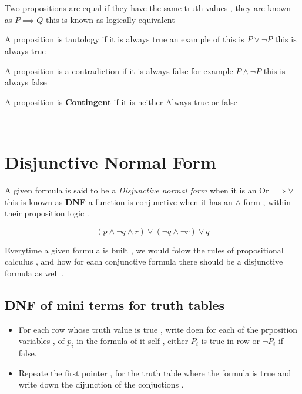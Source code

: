 \documentclass{article}
\theoremstyle{mytheoremstyle}
\theoremstyle{mytheoremstyle}
\theoremstyle{myproblemstyle}
\begin{document}
\\ \\


\begin{definition}
 Two propositions are equal if they have the same truth values , they are known as $ P \implies Q$ this is known as logically equivalent
\end{definition}

\begin{definition}
A proposition is tautology if it is always true an example of this is $ P \lor \neg P$ this is always true

\end{definition}

\begin{definition}
A proposition is a contradiction if it is always false for example $ P \land \neg P $ this is always false
\end{definition}

\begin{definition}
A proposition is \textbf{Contingent} if it is neither Always true or false
\end{definition}

\\
\section{Disjunctive Normal Form}
A given formula is said to be a \textit{Disjunctive normal form} when it is an Or $\implies \lor$ this is known as \textbf{DNF} a function is conjunctive when it has an $ \land $ form , within their proposition logic .

\[(p \land \neg q \land r) \lor (\neg q \land \neg r) \lor q \]

Everytime a given formula is built , we would folow the rules of propositional calculus , and how for each conjunctive formula there should be a disjunctive formula as well .

\subsection{DNF of mini terms for truth tables}
\begin{itemize}
    \item For each row whose truth value is true , write doen for each of the prposition variables , of $ p_i $ in the formula of it self , either $P_i$ is true in row or $\neg P_i$ if false.
    \item Repeate the first pointer , for the truth table where the formula is true and write down the dijunction of the conjuctions .
\end{itemize}
\end{document}
